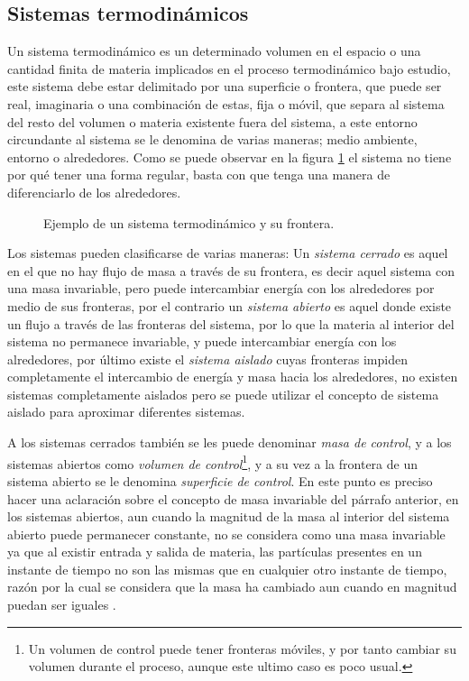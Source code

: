 \documentclass[../master.tex]{subfiles}
\begin{document}
\subsection{Sistemas termodinámicos}

Un sistema termodinámico es un determinado volumen en el espacio o una cantidad finita de materia implicados en el proceso termodinámico bajo estudio, este sistema debe estar delimitado por una superficie o frontera, que puede ser real, imaginaria o una combinación de estas, fija o móvil, que separa al sistema del resto del volumen o materia existente fuera del sistema, a este entorno circundante al sistema se le denomina de varias maneras; medio ambiente, entorno o alrededores. Como se puede observar en la figura \ref{fig:exp_sistema} el sistema no tiene por qué tener una forma regular, basta con que tenga una manera de diferenciarlo de los alrededores.

\begin{figure}[htbp]
    \centering
    
    \caption{Ejemplo de un sistema termodinámico y su frontera.}
    \label{fig:exp_sistema}
\end{figure}

Los sistemas pueden clasificarse de varias maneras: Un \emph{sistema cerrado} es aquel en el que no hay flujo de masa a través de su frontera, es decir aquel sistema con una masa invariable, pero puede intercambiar energía con los alrededores por medio de sus fronteras, por el contrario un \emph{sistema abierto} es aquel donde existe un flujo a través de las fronteras del sistema, por lo que la materia al interior del sistema no permanece invariable, y puede intercambiar energía con los alrededores, por último existe el \emph{sistema aislado} cuyas fronteras impiden completamente el intercambio de energía y masa hacia los alrededores, no existen sistemas completamente aislados pero se puede utilizar el concepto de sistema aislado para aproximar diferentes sistemas.

A los sistemas cerrados también se les puede denominar \emph{masa de control}, y a los sistemas abiertos como \emph{volumen de control}\footnote{Un volumen de control puede tener fronteras móviles, y por tanto cambiar su volumen durante el proceso, aunque este ultimo caso es poco usual.}, y a su vez a la frontera de un sistema abierto se le denomina \emph{superficie de control}. En este punto es preciso hacer una aclaración sobre el concepto de masa invariable del párrafo anterior, en los sistemas abiertos, aun cuando la magnitud de la masa al interior del sistema abierto puede permanecer constante, no se considera como una masa invariable ya que al existir entrada y salida de materia, las partículas presentes en un instante de tiempo no son las mismas que en cualquier otro instante de tiempo, razón por la cual se considera que la masa ha cambiado aun cuando en magnitud puedan ser iguales \parencites{clavell}{faires}{wark}.
\end{document}
